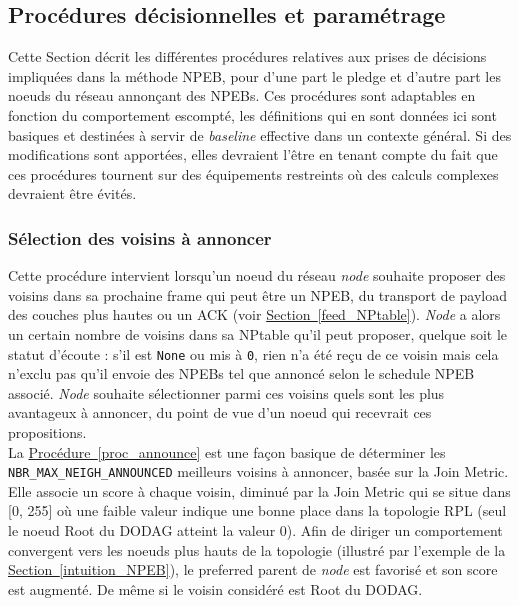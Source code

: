 \documentclass[]{report}
\newcommand{\wordlink}[2]{\hyperref[#2]{#1~\ref{#2}}}
\begin{document}
\subsection{Procédures décisionnelles et paramétrage}
\label{decisional}

Cette Section décrit les différentes procédures relatives aux prises de décisions impliquées dans la méthode NPEB, pour d'une part le pledge et d'autre part les noeuds du réseau annonçant des NPEBs. Ces procédures sont adaptables en fonction du comportement escompté, les définitions qui en sont données ici sont basiques et destinées à servir de \textit{baseline} effective dans un contexte général. Si des modifications sont apportées, elles devraient l'être en tenant compte du fait que ces procédures tournent sur des équipements restreints où des calculs complexes devraient être évités.

\subsubsection{Sélection des voisins à annoncer}

Cette procédure intervient lorsqu'un noeud du réseau \textit{node} souhaite proposer des voisins dans sa prochaine frame qui peut être un NPEB, du transport de payload des couches plus hautes ou un ACK (voir \wordlink{Section}{feed_NPtable}). \textit{Node} a alors un certain nombre de voisins dans sa NPtable qu'il peut proposer, quelque soit le statut d'écoute : s'il est \texttt{None} ou mis à \texttt{0}, rien n'a été reçu de ce voisin mais cela n'exclu pas qu'il envoie des NPEBs tel que annoncé selon le schedule NPEB associé. \textit{Node} souhaite sélectionner parmi ces voisins quels sont les plus avantageux à annoncer, du point de vue d'un noeud qui recevrait ces propositions.\\

La \wordlink{Procédure}{proc_announce} est une façon basique de déterminer les \texttt{NBR\_MAX\_NEIGH\_ANNOUNCED} meilleurs voisins à annoncer, basée sur la Join Metric. Elle associe un score à chaque voisin, diminué par la Join Metric qui se situe dans [0, 255] où une faible valeur indique une bonne place dans la topologie RPL (seul le noeud Root du DODAG atteint la valeur 0). Afin de diriger un comportement convergent vers les noeuds plus hauts de la topologie (illustré par l'exemple de la \wordlink{Section}{intuition_NPEB}), le preferred parent de \textit{node} est favorisé et son score est augmenté. De même si le voisin considéré est Root du DODAG.\\
\end{document}
